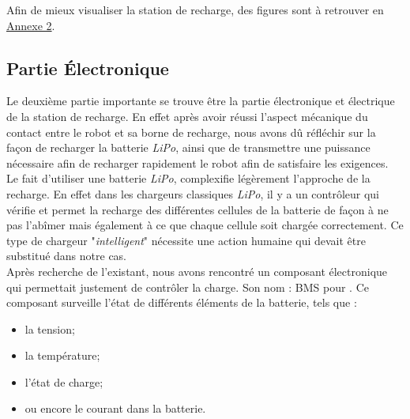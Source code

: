 \documentclass[french]{rapportENSTAB}
\begin{document}
Afin de mieux visualiser la station de recharge, des figures sont à retrouver en \hyperlink{annexe}{Annexe 2}.\\

\subsection{Partie Électronique}
Le deuxième partie importante se trouve être la partie électronique et électrique de la station de recharge. En effet après avoir réussi l'aspect mécanique du contact entre le robot et sa borne de recharge, nous avons dû réfléchir sur la façon de recharger la batterie \textit{LiPo}, ainsi que de transmettre une puissance nécessaire afin de recharger rapidement le robot afin de satisfaire les exigences. \\

Le fait d'utiliser une batterie \textit{LiPo}, complexifie légèrement l'approche de la recharge. En effet dans les chargeurs classiques \textit{LiPo}, il y a un contrôleur qui vérifie et permet la recharge des différentes cellules de la batterie de façon à ne pas l'abîmer mais également à ce que chaque cellule soit chargée correctement. Ce type de chargeur "\textit{intelligent}" nécessite une action humaine qui devait être substitué dans notre cas.\\
Après recherche de l'existant, nous avons rencontré un composant électronique qui permettait justement de contrôler la charge. Son nom : BMS pour . Ce composant surveille l'état de différents éléments de la batterie, tels que : \begin{itemize}[label=\textbullet, font=\small\color{blue}]
    \item la tension;
    \item la température;
    \item l'état de charge;
    \item ou encore le courant dans la batterie.
\end{itemize}
\\
\end{document}
